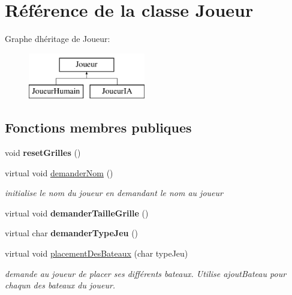 \hypertarget{class_joueur}{}\section{Référence de la classe Joueur}
\label{class_joueur}
Graphe d\textquotesingle{}héritage de Joueur\+:\begin{figure}[H]
\begin{center}
\leavevmode
\includegraphics[height=2.000000cm]{class_joueur}
\end{center}
\end{figure}
\subsection*{Fonctions membres publiques}
\begin{DoxyCompactItemize}
\item 
void {\bfseries reset\+Grilles} ()\hypertarget{class_joueur_a2f7fe616414bfb0ab31631ea10b38ae6}{}\label{class_joueur_a2f7fe616414bfb0ab31631ea10b38ae6}

\item 
virtual void \hyperlink{class_joueur_a9027bfc622d9a175340b5fffe915c7b2}{demander\+Nom} ()\hypertarget{class_joueur_a9027bfc622d9a175340b5fffe915c7b2}{}\label{class_joueur_a9027bfc622d9a175340b5fffe915c7b2}

\begin{DoxyCompactList}\small\item\em initialise le nom du joueur en demandant le nom au joueur \end{DoxyCompactList}\item 
virtual void {\bfseries demander\+Taille\+Grille} ()\hypertarget{class_joueur_a6a492734cdd1d8363c1617d598df9817}{}\label{class_joueur_a6a492734cdd1d8363c1617d598df9817}

\item 
virtual char {\bfseries demander\+Type\+Jeu} ()\hypertarget{class_joueur_a84baf36faf6b22fc23e4e793d4988793}{}\label{class_joueur_a84baf36faf6b22fc23e4e793d4988793}

\item 
virtual void \hyperlink{class_joueur_aa97f71a90328693e0047ba2f48d61b4b}{placement\+Des\+Bateaux} (char type\+Jeu)
\begin{DoxyCompactList}\small\item\em demande au joueur de placer ses différents bateaux. Utilise ajout\+Bateau pour chaqun des bateaux du joueur. \end{DoxyCompactList}\end{DoxyCompactItemize}
